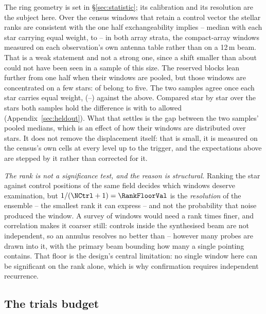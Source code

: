 The ring geometry is set in \S\ref{sec:statistic}; its calibration and its
resolution are the subject here. Over the \VerNTested{} census windows that
retain a control vector the stellar ranks are consistent with the one half
exchangeability implies -- median \BkRankBalSurv{} with each star carrying
equal weight, \BkRankBalSurvLo{} to \BkRankBalSurvHi{} -- in both array
strata, the compact-array windows measured on each observation's own antenna
table rather than on a 12\,m beam. That is a weak statement and not a strong
one, since a shift smaller than about \VerKsPowerAca{} could not have been
seen in a sample of this size. The reserved blocks lean further from one half
when their windows are pooled, but those windows are concentrated on a few
stars: \BkRankTopFiveWin{} of \HoWin{} belong to five. The two
samples agree once each star carries equal weight, \BkRankBalHo{}
(\BkRankBalHoLo--\BkRankBalHoHi) against the \BkRankBalSurv{} above.
Compared star by star over the \BkRankPairedStars{} stars both samples hold
the difference is \BkRankPaired{} with \BkRankPairedLo{} to
\BkRankPairedHi{} allowed (Appendix~\ref{sec:heldout}). What that settles is
the gap between the two samples' pooled medians, which is an effect of how
their windows are distributed over stars. It does not remove the displacement
itself: that is small, it is measured on the census's own cells at every level
up to the trigger, and the expectations above are stepped by it rather than
corrected for it.

\emph{The rank is not a significance test, and the reason is structural.}
Ranking the star against \NCtrl{} control positions of the same field
decides which windows deserve examination, but $1/(\NCtrl+1)=\RankFloorVal$
is the \emph{resolution} of the ensemble -- the smallest rank it can
express -- and not the probability that noise produced the window. A survey
of \NWindows{} windows would need a rank \BonfRankRatio{} times finer, and
correlation makes it coarser still: controls inside the synthesised beam are
not independent, so an annulus resolves no better than
\RankEffLo--\RankEffHi{} however many probes are drawn into it, with the
primary beam bounding how many a single pointing contains. That floor is the
design's central limitation: no single window here can be significant on the
rank alone, which is why confirmation requires independent recurrence.

\subsection{The trials budget}

